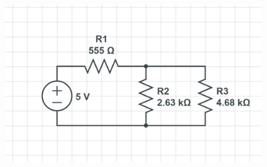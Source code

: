 \documentclass[11pt]{article}
\begin{document}
\begin{figure}[h]
\begin{center}
		\includegraphics[scale=0.3]{S3}
	\end{center}
\end{figure}
\end{document}
